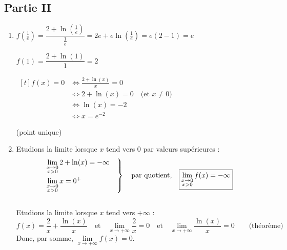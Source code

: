 \documentclass{scrartcl}
\begin{document}
\begin{adjustwidth}{2em}{0pt}
        \subsection*{Partie II}
        \begin{enumerate}
            \item	$f\left(\frac{1}{e}\right)=\dfrac{2+\ln\left(\frac{1}{e}\right)}{\frac{1}{e}}=2e+e\ln\left(\frac{1}{e}\right)=e(2-1)=e$ \qquad {} \par
                    $f(1)=\dfrac{2+\ln(1)}{1}=2$ \qquad {} \par
                    \vspace{1em}
                    $\begin{aligned}[t]
                        f(x)=0&\iff \frac{2+\ln(x)}{x}=0 \\
                        &\iff 2+\ln(x)=0\quad\text{(et $x\neq 0$)} \\
                        &\iff \ln(x)=-2 \\
                        &\iff x=e^{-2}
                    \end{aligned}$ \par\vspace{1em}
                     (point unique)
            \item   Etudions la limite lorsque $x$ tend vers $0$ par valeurs supérieures : \vspace{1em}
                    \[\begin{drcases}\lim\limits_{\substack{x\to 0\\x>0}}2+\ln(x)=-\infty\quad \\ \lim\limits_{\substack{x\to 0\\x>0}}x=0^+\end{drcases}\quad\text{par quotient,}\quad\boxed{\lim\limits_{\substack{x\to 0\\x>0}}f(x)=-\infty}\] \\ \vspace{1em}
                    Etudions la limite lorsque $x$ tend vers $+\infty$ :
                    \[f(x)=\frac{2}{x}+\frac{\ln(x)}{x}\quad\text{et}\quad\lim\limits_{x\to +\infty}\frac{2}{x}=0\quad\text{et}\quad\lim\limits_{x\to +\infty}\frac{\ln(x)}{x}=0\qquad\text{(théorème)}\] \vspace{1em}
                    Donc, par somme, $\lim\limits_{x\to +\infty}f(x)=0$.


\end{enumerate}
\end{adjustwidth}
\end{document}
